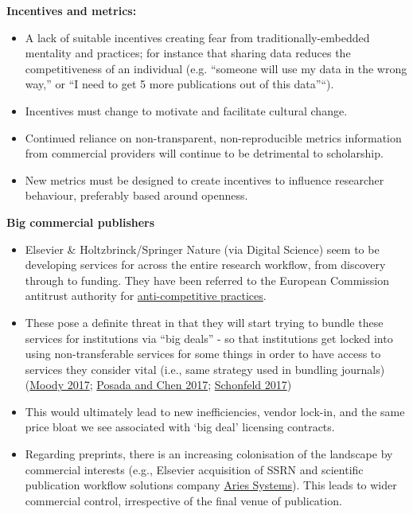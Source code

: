 \textbf{Incentives and metrics:}

\begin{itemize}
\item
  A lack of suitable incentives creating fear from
  traditionally-embedded mentality and practices; for instance that
  sharing data reduces the competitiveness of an individual (e.g.
  ``someone will use my data in the wrong way,'' or ``I need to get 5
  more publications out of this data''``).
\item
  Incentives must change to motivate and facilitate cultural change.
\item
  Continued reliance on non-transparent, non-reproducible metrics
  information from commercial providers will continue to be detrimental
  to scholarship.
\item
  New metrics must be designed to create incentives to influence
  researcher behaviour, preferably based around openness.
\end{itemize}

\textbf{Big commercial publishers}

\begin{itemize}
\item
  Elsevier \& Holtzbrinck/Springer Nature (via Digital Science) seem to
  be developing services for across the entire research workflow, from
  discovery through to funding. They have been referred to the European
  Commission antitrust authority for
  \href{https://zenodo.org/record/1472045}{anti-competitive practices}.
\item
  These pose a definite threat in that they will start trying to bundle
  these services for institutions via ``big deals'' - so that
  institutions get locked into using non-transferable services for some
  things in order to have access to services they consider vital (i.e.,
  same strategy used in bundling journals)
  (\href{https://www.techdirt.com/articles/20170804/05454537924/elsevier-continues-to-build-monopoly-solution-all-aspects-scholarly-communication.shtml}{Moody
  2017};
  \href{http://knowledgegap.org/index.php/sub-projects/rent-seeking-and-financialization-of-the-academic-publishing-industry/preliminary-findings/}{Posada
  and Chen 2017};
  \href{http://www.sr.ithaka.org/blog/the-center-for-open-science-alternative-to-elsevier-announces-new-preprint-services-today/}{Schonfeld
  2017})
\item
  This would ultimately lead to new inefficiencies, vendor lock-in, and
  the same price bloat we see associated with `big deal' licensing
  contracts.
\item
  Regarding preprints, there is an increasing colonisation of the
  landscape by commercial interests (e.g., Elsevier acquisition of SSRN
  and scientific publication workflow solutions company
  \href{https://www.elsevier.com/about/press-releases/corporate/elsevier-to-acquire-aries-systems-a-best-in-class-publication-workflow-solutions-provider}{Aries
  Systems}). This leads to wider commercial control, irrespective of the
  final venue of publication.
\end{itemize}

